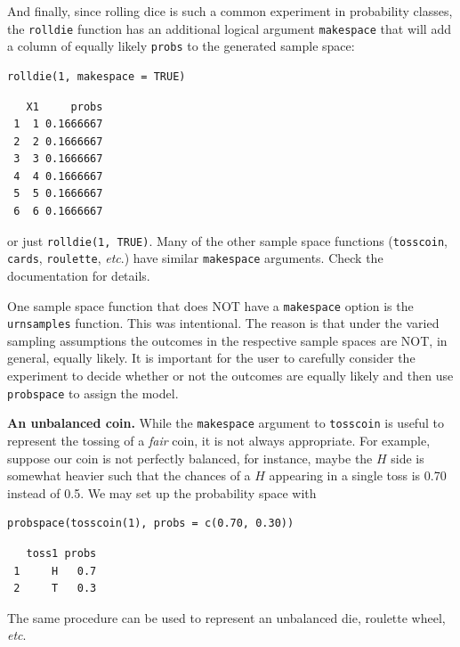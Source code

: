 \documentclass[captions=tableheading]{scrbook}
\begin{document}
\begin{example}
And finally, since rolling dice is such a common experiment in probability classes, the \texttt{rolldie} function has an additional logical argument \texttt{makespace} that will add a column of equally likely \texttt{probs} to the generated sample space: 


\lstset{language=R}
\begin{lstlisting}
rolldie(1, makespace = TRUE)
\end{lstlisting}

\begin{verbatim}
   X1     probs
 1  1 0.1666667
 2  2 0.1666667
 3  3 0.1666667
 4  4 0.1666667
 5  5 0.1666667
 6  6 0.1666667
\end{verbatim}

\noindent 
or just \texttt{rolldie(1, TRUE)}. Many of the other sample space functions (\texttt{tosscoin}, \texttt{cards}, \texttt{roulette}, \emph{etc}.) have similar \texttt{makespace} arguments. Check the documentation for details.

\end{example}

One sample space function that does NOT have a \texttt{makespace} option is the \texttt{urnsamples} function. This was intentional. The reason is that under the varied sampling assumptions the outcomes in the respective sample spaces are NOT, in general, equally likely. It is important for the user to carefully consider the experiment to decide whether or not the outcomes are equally likely and then use \texttt{probspace} to assign the model.

\begin{example}
\textbf{An unbalanced coin.} While the \texttt{makespace} argument to \texttt{tosscoin} is useful to represent the tossing of a \emph{fair} coin, it is not always appropriate. For example, suppose our coin is not perfectly balanced, for instance, maybe the \(H\) side is somewhat heavier such that the chances of a \(H\) appearing in a single toss is 0.70 instead of 0.5. We may set up the probability space with 


\lstset{language=R}
\begin{lstlisting}
probspace(tosscoin(1), probs = c(0.70, 0.30))
\end{lstlisting}

\begin{verbatim}
   toss1 probs
 1     H   0.7
 2     T   0.3
\end{verbatim}

The same procedure can be used to represent an unbalanced die, roulette wheel, \emph{etc}.

\end{example}
\end{document}
